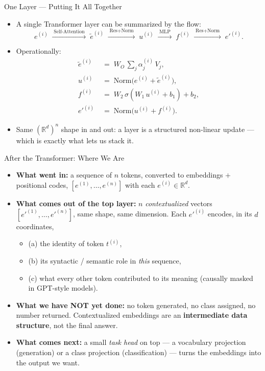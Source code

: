 \begin{frame}{One Layer --- Putting It All Together}
\begin{itemize}
\item A single Transformer layer can be summarized by the flow:
\[
   e^{(i)} \;\xrightarrow{\;\text{Self-Attention}\;}\; \tilde{e}^{(i)}
   \;\xrightarrow{\;\text{Res+Norm}\;}\; u^{(i)}
   \;\xrightarrow{\;\text{MLP}\;}\; f^{(i)}
   \;\xrightarrow{\;\text{Res+Norm}\;}\; e'^{(i)}.
\]

\medskip
\item Operationally:
\[
   \begin{aligned}
       \tilde{e}^{(i)} &\;=\; W_{O}\,\sum_{j} \alpha_{j}^{(i)}\,V_{j}, \\[2pt]
       u^{(i)} &\;=\; \mathrm{Norm}\bigl(e^{(i)} + \tilde{e}^{(i)}\bigr), \\[2pt]
       f^{(i)} &\;=\; W_{2}\,\sigma(W_{1}\,u^{(i)} + b_{1}) + b_{2}, \\[2pt]
       e'^{(i)} &\;=\; \mathrm{Norm}\bigl(u^{(i)} + f^{(i)}\bigr).
   \end{aligned}
\]

\medskip
\item Same $(\mathbb{R}^d)^n$ shape in and out: a layer is a structured non-linear update --- which is exactly what lets us stack it.
\end{itemize}
\end{frame}

\begin{frame}{After the Transformer: Where We Are}
\begin{itemize}
\item \textbf{What went in:} a sequence of $n$ tokens, converted to embeddings $+$ positional codes, $[e^{(1)}, \ldots, e^{(n)}]$ with each $e^{(i)} \in \mathbb{R}^{d}$.

\medskip
\item \textbf{What comes out of the top layer:} $n$ \emph{contextualized} vectors $[e'^{(1)}, \ldots, e'^{(n)}]$, same shape, same dimension. Each $e'^{(i)}$ encodes, in its $d$ coordinates,
\begin{itemize}
    \item (a) the identity of token $t^{(i)}$,
    \item (b) its syntactic / semantic role in \emph{this} sequence,
    \item (c) what every other token contributed to its meaning (causally masked in GPT-style models).
\end{itemize}

\medskip
\item \textbf{What we have NOT yet done:} no token generated, no class assigned, no number returned. Contextualized embeddings are an \textbf{intermediate data structure}, not the final answer.

\medskip
\item \textbf{What comes next:} a small \emph{task head} on top --- a vocabulary projection (generation) or a class projection (classification) --- turns the embeddings into the output we want.
\end{itemize}
\end{frame}

